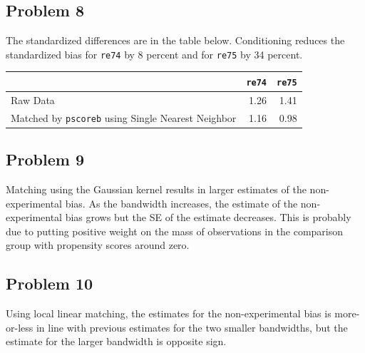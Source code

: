 \documentclass{article}
\begin{document}
\begin{center}

\end{center}

\subsection*{Problem 8}

The standardized differences are in the table below.  Conditioning reduces the standardized bias for \texttt{re74} by 8 percent and for \texttt{re75} by 34 percent.

\begin{center}
\begin{tabular}{ l r r}
\hline
& \texttt{re74} & \texttt{re75} \\ 
\hline
Raw Data  & 1.26 &  1.41 \\  
Matched by \texttt{pscoreb} using Single Nearest Neighbor & 1.16 & 0.98 \\
\hline
\end{tabular}
\end{center}

\subsection*{Problem 9}

Matching using the Gaussian kernel results in larger estimates of the non-experimental bias. As the bandwidth increases, the estimate of the non-experimental bias grows but the SE of the estimate decreases.  This is probably due to putting positive weight on the mass of observations in the comparison group with propensity scores around zero.

\begin{center}

\end{center}

\pagebreak

\subsection*{Problem 10}

Using local linear matching, the estimates for the non-experimental bias is more-or-less in line with previous estimates for the two smaller bandwidths, but the estimate for the larger bandwidth is opposite sign.

\begin{center}

\end{center}
\end{document}
